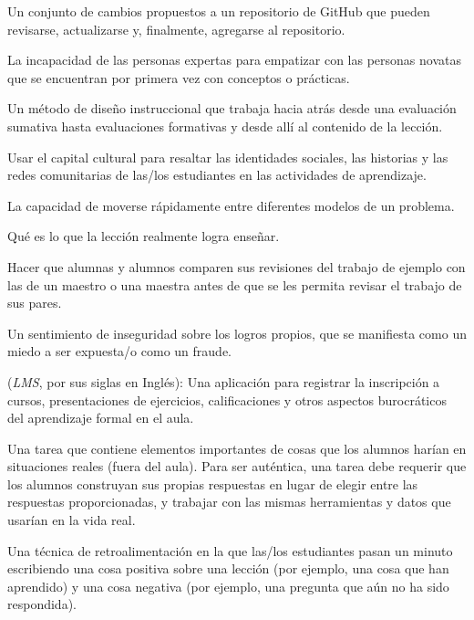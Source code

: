 \begin{description}
 Un conjunto de cambios propuestos a un repositorio de
GitHub que pueden revisarse, actualizarse y, finalmente, agregarse al repositorio.

 La incapacidad de las personas expertas
para empatizar con las personas novatas que se encuentran por primera
vez con conceptos o prácticas.

 Un método de diseño instruccional que
trabaja hacia atrás desde una evaluación sumativa hasta evaluaciones formativas y desde allí al contenido de la lección.

 Usar el capital cultural
para resaltar las identidades sociales, las historias y las redes comunitarias de
las/los estudiantes en las actividades de aprendizaje.

 La capacidad de moverse
rápidamente entre diferentes modelos de un problema.

 Qué es lo que la lección realmente logra enseñar.

 Hacer que alumnas y alumnos comparen sus
revisiones del trabajo de ejemplo con las de un maestro o una maestra  antes de que
se les permita revisar el trabajo de sus pares.

 Un sentimiento de inseguridad sobre
los logros propios, que se manifiesta como un miedo a ser expuesta/o como un fraude.

 (\emph{LMS}, por sus siglas en Inglés): Una aplicación para registrar la inscripción a cursos, presentaciones de ejercicios, calificaciones y otros aspectos burocráticos del aprendizaje formal en el aula.

 Una tarea que contiene elementos importantes
de cosas que los alumnos harían en situaciones reales (fuera del aula). Para
ser auténtica, una tarea debe requerir que los alumnos construyan sus propias respuestas
en lugar de elegir entre las respuestas proporcionadas, y trabajar con las mismas
herramientas y datos que usarían en la vida real.

 Una técnica de retroalimentación en la
que las/los estudiantes pasan un minuto escribiendo una cosa positiva sobre una lección
(por ejemplo, una cosa que han aprendido) y una cosa negativa (por ejemplo, una pregunta que aún no ha sido respondida).


\end{description}

